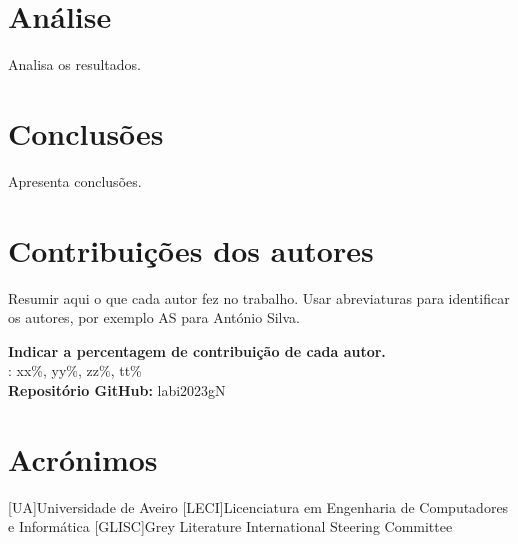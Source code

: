 \documentclass{report}
\begin{document}
\chapter{Análise}
\label{chap.analise}
Analisa os resultados.

\chapter{Conclusões}
\label{chap.conclusao}
Apresenta conclusões.

\chapter*{Contribuições dos autores}
Resumir aqui o que cada autor fez no trabalho.
Usar abreviaturas para identificar os autores,
por exemplo AS para António Silva.

\vspace{10pt}
\textbf{Indicar a percentagem de contribuição de cada autor.}\\

\autores : xx\%, yy\%, zz\%, tt\%\\

\textbf{Repositório GitHub:} labi2023gN

\chapter*{Acrónimos}
\begin{acronym}
[UA]{Universidade de Aveiro}
[LECI]{Licenciatura em Engenharia de Computadores e Informática}
[GLISC]{Grey Literature International Steering Committee}
\end{acronym}


\printbibliography
\end{document}
